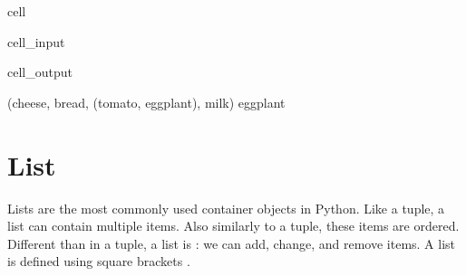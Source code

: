\documentclass[letterpaper,10pt,english]{jupyterBook}
\begin{document}
\begin{sphinxuseclass}{cell}\begin{sphinxVerbatimInput}

\begin{sphinxuseclass}{cell_input}
\begin{sphinxVerbatim}[commandchars=\\\{\}]
   
     
\PYG{p}{[}\PYG{p}{]}\PYG{p}{[}\PYG{p}{]}
\end{sphinxVerbatim}

\end{sphinxuseclass}\end{sphinxVerbatimInput}
\begin{sphinxVerbatimOutput}

\begin{sphinxuseclass}{cell_output}
\begin{sphinxVerbatim}[commandchars=\\\{\}]
(\PYGZsq{}cheese\PYGZsq{}, \PYGZsq{}bread\PYGZsq{}, (\PYGZsq{}tomato\PYGZsq{}, \PYGZsq{}eggplant\PYGZsq{}), \PYGZsq{}milk\PYGZsq{})
eggplant
\end{sphinxVerbatim}

\end{sphinxuseclass}\end{sphinxVerbatimOutput}

\end{sphinxuseclass}

\section{List}
\label{\detokenize{notebooks/02_Containers/02_Containers_student:list}}
\sphinxAtStartPar
Lists are the most commonly used container objects in Python. Like a tuple, a list can contain multiple items. Also similarly to a tuple, these items are ordered. Different than in a tuple, a list is : we can add, change, and remove items. A list is defined using square brackets \sphinxcode{\sphinxupquote{{[}{]}}}.
\end{document}
